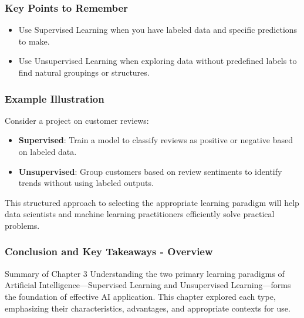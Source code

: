 \documentclass[aspectratio=169]{beamer}
\begin{document}
\begin{frame}[fragile]
    \frametitle{Key Points to Remember}
    \begin{itemize}
        \item Use Supervised Learning when you have labeled data and specific predictions to make.
        \item Use Unsupervised Learning when exploring data without predefined labels to find natural groupings or structures.
    \end{itemize}
\end{frame}

\begin{frame}[fragile]
    \frametitle{Example Illustration}
    Consider a project on customer reviews:
    \begin{itemize}
        \item \textbf{Supervised}: Train a model to classify reviews as positive or negative based on labeled data.
        \item \textbf{Unsupervised}: Group customers based on review sentiments to identify trends without using labeled outputs.
    \end{itemize}
    This structured approach to selecting the appropriate learning paradigm will help data scientists and machine learning practitioners efficiently solve practical problems.
\end{frame}

\begin{frame}[fragile]
    \frametitle{Conclusion and Key Takeaways - Overview}
    \begin{block}{Summary of Chapter 3}
        Understanding the two primary learning paradigms of Artificial Intelligence—Supervised Learning and Unsupervised Learning—forms the foundation of effective AI application. This chapter explored each type, emphasizing their characteristics, advantages, and appropriate contexts for use.
    \end{block}
\end{frame}
\end{document}
